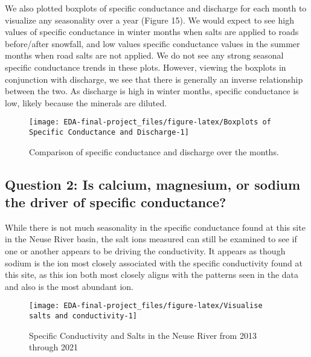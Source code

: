 \documentclass[
  12pt,
]{article}
\begin{document}
We also plotted boxplots of specific conductance and discharge for each
month to visualize any seasonality over a year (Figure 15). We would
expect to see high values of specific conductance in winter months when
salts are applied to roads before/after snowfall, and low values
specific conductance values in the summer months when road salts are not
applied. We do not see any strong seasonal specific conductance trends
in these plots. However, viewing the boxplots in conjunction with
discharge, we see that there is generally an inverse relationship
between the two. As discharge is high in winter months, specific
conductance is low, likely because the minerals are diluted.

\begin{figure}

{\centering \texttt{[image: EDA-final-project\_files/figure-latex/Boxplots of Specific Conductance and Discharge-1]} 

}

\caption{Comparison of specific conductance and discharge over the months.}\label{fig:Boxplots of Specific Conductance and Discharge}
\end{figure}

\newpage

\hypertarget{question-2-is-calcium-magnesium-or-sodium-the-driver-of-specific-conductance}{%
\subsection{Question 2: Is calcium, magnesium, or sodium the driver of
specific
conductance?}\label{question-2-is-calcium-magnesium-or-sodium-the-driver-of-specific-conductance}}

While there is not much seasonality in the specific conductance found at
this site in the Neuse River basin, the salt ions measured can still be
examined to see if one or another appears to be driving the
conductivity. It appears as though sodium is the ion most closely
associated with the specific conductivity found at this site, as this
ion both most closely aligns with the patterns seen in the data and also
is the most abundant ion.

\begin{figure}

\texttt{[image: EDA-final-project\_files/figure-latex/Visualise salts and conductivity-1]} \hfill{}

\caption{Specific Conductivity and Salts in the Neuse River from 2013 through 2021}\label{fig:Visualise salts and conductivity}
\end{figure}
\end{document}
